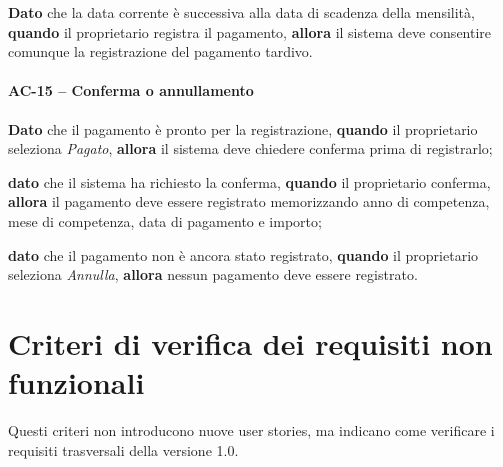 \documentclass[12pt,a4paper]{article}
\begin{document}
\textbf{Dato} che la data corrente è successiva alla data di scadenza della
mensilità,
\textbf{quando} il proprietario registra il pagamento,
\textbf{allora} il sistema deve consentire comunque la registrazione del
pagamento tardivo.

\paragraph{AC-15 -- Conferma o annullamento}
\textbf{Dato} che il pagamento è pronto per la registrazione,
\textbf{quando} il proprietario seleziona \emph{Pagato},
\textbf{allora} il sistema deve chiedere conferma prima di registrarlo;

\textbf{dato} che il sistema ha richiesto la conferma,
\textbf{quando} il proprietario conferma,
\textbf{allora} il pagamento deve essere registrato memorizzando anno di competenza,
mese di competenza, data di pagamento e importo;

\textbf{dato} che il pagamento non è ancora stato registrato,
\textbf{quando} il proprietario seleziona \emph{Annulla},
\textbf{allora} nessun pagamento deve essere registrato.

\section{Criteri di verifica dei requisiti non funzionali}

Questi criteri non introducono nuove user stories, ma indicano come verificare i requisiti
trasversali della versione 1.0.
\end{document}
